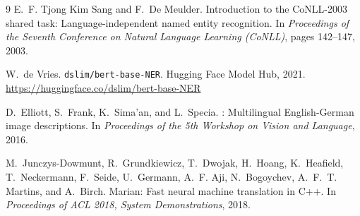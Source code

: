 \documentclass[11pt,a4paper]{article}
\begin{document}
\begin{thebibliography}{9}
E.~F. Tjong Kim Sang and F.~De Meulder.
\newblock Introduction to the {CoNLL}-2003 shared task: Language-independent named entity recognition.
\newblock In \emph{Proceedings of the Seventh Conference on Natural Language Learning (CoNLL)}, pages 142--147, 2003.

W.~de Vries.
\newblock \texttt{dslim/bert-base-NER}.
\newblock Hugging Face Model Hub, 2021.
\newblock \url{https://huggingface.co/dslim/bert-base-NER}

D.~Elliott, S.~Frank, K.~Sima'an, and L.~Specia.
: Multilingual English-German image descriptions.
\newblock In \emph{Proceedings of the 5th Workshop on Vision and Language}, 2016.

M.~Junczys-Dowmunt, R.~Grundkiewicz, T.~Dwojak, H.~Hoang, K.~Heafield,
T.~Neckermann, F.~Seide, U.~Germann, A.~F. Aji, N.~Bogoychev, A.~F.~T. Martins,
and A.~Birch.
\newblock Marian: Fast neural machine translation in {C++}.
\newblock In \emph{Proceedings of ACL 2018, System Demonstrations}, 2018.

\end{thebibliography}
\end{document}
